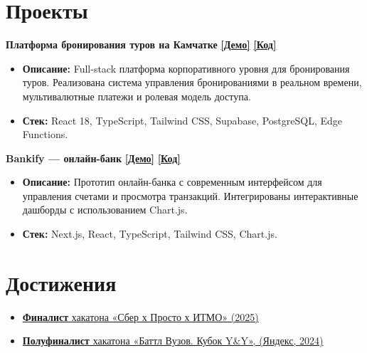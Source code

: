 \documentclass[a4paper,10pt]{article}
\begin{document}
\section*{Проекты}
\noindent\textbf{Платформа бронирования туров на Камчатке} \hfill \href{https://kamchatka-adventures.vercel.app/}{\textbf{[Демо]}} \quad \href{https://github.com/Jimike110/Kamchatka/}{\textbf{[Код]}} \\
\begin{itemize}[leftmargin=*, topsep=0.5ex, itemsep=0.2ex]
    \item \textbf{Описание:} Full-stack платформа корпоративного уровня для бронирования туров. Реализована система управления бронированиями в реальном времени, мультивалютные платежи и ролевая модель доступа.
    \item \textbf{Стек:} React 18, TypeScript, Tailwind CSS, Supabase, PostgreSQL, Edge Functions.
\end{itemize}
\vspace{1ex}

\noindent\textbf{Bankify — онлайн-банк} \hfill \href{https://bankify-jimike.vercel.app/}{\textbf{[Демо]}} \quad \href{https://github.com/Jimike110/bankify}{\textbf{[Код]}} \\
\begin{itemize}[leftmargin=*, topsep=0.5ex, itemsep=0.2ex]
    \item \textbf{Описание:} Прототип онлайн-банка с современным интерфейсом для управления счетами и просмотра транзакций. Интегрированы интерактивные дашборды с использованием Chart.js.
    \item \textbf{Стек:} Next.js, React, TypeScript, Tailwind CSS, Chart.js.
\end{itemize}


\section*{Достижения}
\begin{itemize}[leftmargin=*, topsep=0.5ex, itemsep=0.2ex]
    \item \href{https://disk.yandex.ru/i/wE10Gv0LYPanjg}{\textbf{Финалист} хакатона «Сбер х Просто х ИТМО» (2025)}
    \item \href{https://certify.s3.yandex.net/young-yandex/74b6021d-3100-422c-b4d4-0a0d8d1833ea/4df33b64-d63d-402a-92cb-dd5955e80ff3.pdf}{\textbf{Полуфиналист} хакатона «Баттл Вузов. Кубок Y\&Y», (Яндекс, 2024)}
\end{itemize}
\end{document}
